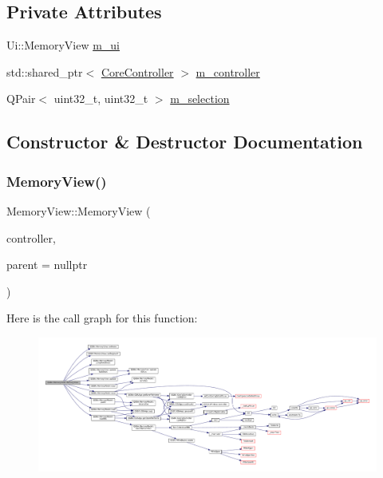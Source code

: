 \subsection*{Private Attributes}
\begin{DoxyCompactItemize}
\item 
Ui\+::\+Memory\+View \mbox{\hyperlink{class_q_g_b_a_1_1_memory_view_af3fc8d5c3244667d89ea6b6c8db3f475}{m\+\_\+ui}}
\item 
std\+::shared\+\_\+ptr$<$ \mbox{\hyperlink{class_q_g_b_a_1_1_core_controller}{Core\+Controller}} $>$ \mbox{\hyperlink{class_q_g_b_a_1_1_memory_view_a5f0c4e402ec461a2709ea3de6ebff163}{m\+\_\+controller}}
\item 
Q\+Pair$<$ uint32\+\_\+t, uint32\+\_\+t $>$ \mbox{\hyperlink{class_q_g_b_a_1_1_memory_view_abf4e35eab2e669a0280aed8bab167bed}{m\+\_\+selection}}
\end{DoxyCompactItemize}


\subsection{Constructor \& Destructor Documentation}
\mbox{\label{class_q_g_b_a_1_1_memory_view_a62ee466e88e04e0e714975227560070a}} 
\subsubsection{\texorpdfstring{Memory\+View()}{MemoryView()}}
{\footnotesize\ttfamily Memory\+View\+::\+Memory\+View (\begin{DoxyParamCaption}\item[{std\+::shared\+\_\+ptr$<$ \mbox{\hyperlink{class_q_g_b_a_1_1_core_controller}{Core\+Controller}} $>$}]{controller,  }\item[{Q\+Widget $\ast$}]{parent = {\ttfamily nullptr} }\end{DoxyParamCaption})}

Here is the call graph for this function\+:
\nopagebreak
\begin{figure}[H]
\begin{center}
\leavevmode
\includegraphics[width=350pt]{class_q_g_b_a_1_1_memory_view_a62ee466e88e04e0e714975227560070a_cgraph}
\end{center}
\end{figure}


